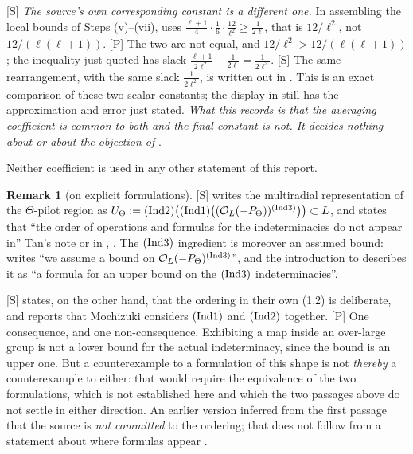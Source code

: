 \documentclass[11pt]{article}
\theoremstyle{plain}
\theoremstyle{definition}
\newtheorem{remark}{Remark}
\newcommand{\Ind}[1]{\textup{(Ind#1)}}
\begin{document}
\textup{[S]} \emph{The source's own corresponding constant is a different one.}  In
assembling the local bounds of Steps (v)--(vii), \cite[Thm.~1.10, proof Step (viii),
p.~30]{IUT4} uses
$\frac{\ell+1}{4}\cdot\frac16\cdot\frac{12}{\ell^{2}}\ge\frac1{2\ell}$, that is
$12/\ell^{2}$, not $12/(\ell(\ell+1))$.  \textup{[P]} The two are not equal, and
$12/\ell^{2}>12/(\ell(\ell+1))$; the inequality just quoted has slack
$\frac{\ell+1}{2\ell^{2}}-\frac1{2\ell}=\frac1{2\ell^{2}}$.  \textup{[S]} The same
rearrangement, with the same slack $\frac1{2\ell^{2}}$, is written out in
\cite[p.~70]{JoshiIV}.  This is an exact
comparison of these two scalar constants; the display in \cite{SS} still has the
approximation and error just stated.  \emph{What this records is that the averaging
coefficient is common to both and the final constant is not.  It decides nothing about
\cite[Cor.~3.12]{IUT3} or about the objection of} \cite{SS}.

Neither coefficient is used in any other statement of this report.

\begin{remark}[on explicit formulations]
\textup{[S]} \cite[\S4.10, eq.~(4.4)]{DH} writes the multiradial representation of
the $\Theta$-pilot region as
$U_\Theta:=\Ind2\bigl(\Ind1\bigl((\mathcal O_L(-P_\Theta))^{\Ind3}\bigr)\bigr)\subset L$,
and \cite[Rem.~4.10.1]{DH} states that ``the order of operations and formulas for the
indeterminacies do not appear in'' Tan's note or in \cite{IUT3}, \cite{IUT4}.  The
$\Ind3$ ingredient is moreover an assumed bound: \cite[\S4.9]{DH} writes ``we assume
a bound on $\mathcal O_L(-P_\Theta)^{\Ind3}$'', and the introduction to \cite[\S4]{DH}
describes it as ``a formula for an upper bound on the $\Ind3$ indeterminacies''.

\textup{[S]} \cite[p.~3]{DH} states, on the other hand, that the ordering in their
own (1.2) is deliberate, and reports that Mochizuki considers $\Ind1$ and $\Ind2$
together.  \textup{[P]} One consequence, and one non-consequence.  Exhibiting a map
inside an over-large group is not a lower bound for the actual indeterminacy, since
the bound is an upper one.  But a counterexample to a formulation of this shape is
not \emph{thereby} a counterexample to \cite{IUT3} either: that would require the
equivalence of the two formulations, which is not established here and which the two
passages above do not settle in either direction.  An earlier version inferred from
the first passage that the source is \emph{not committed} to the ordering; that does
not follow from a statement about where formulas appear .
\end{remark}
\end{document}
